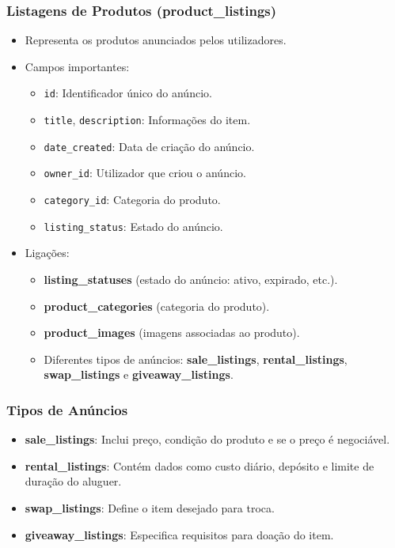 \documentclass[a4paper, 12pt]{article} %
\begin{document}
\subsubsection{\textbf{Listagens de Produtos (product\_listings)}}

\begin{itemize}
    \item Representa os produtos anunciados pelos utilizadores.
    \item Campos importantes:
    \begin{itemize}
        \item \verb|id|: Identificador único do anúncio.
        \item \verb|title|, \verb|description|: Informações do item.
        \item \verb|date_created|: Data de criação do anúncio.
        \item \verb|owner_id|: Utilizador que criou o anúncio.
        \item \verb|category_id|: Categoria do produto.
        \item \verb|listing_status|: Estado do anúncio.
    \end{itemize}
    \item Ligações:
    \begin{itemize}
        \item \textbf{listing\_statuses} (estado do anúncio: ativo, expirado, etc.).
        \item \textbf{product\_categories} (categoria do produto).
        \item \textbf{product\_images} (imagens associadas ao produto).
        \item Diferentes tipos de anúncios: \textbf{sale\_listings}, \textbf{rental\_listings}, \textbf{swap\_listings} e \textbf{giveaway\_listings}.
    \end{itemize}
\end{itemize}

\subsubsection{\textbf{Tipos de Anúncios}}

\begin{itemize}
    \item \textbf{sale\_listings}: Inclui preço, condição do produto e se o preço é negociável.
    \item \textbf{rental\_listings}: Contém dados como custo diário, depósito e limite de duração do aluguer.
    \item \textbf{swap\_listings}: Define o item desejado para troca.
    \item \textbf{giveaway\_listings}: Especifica requisitos para doação do item.
\end{itemize}
\end{document}

